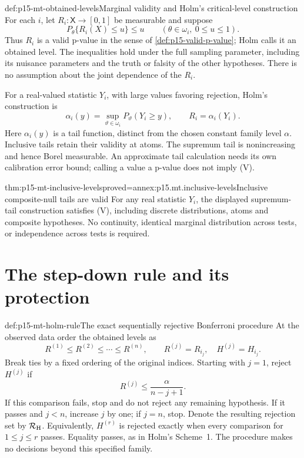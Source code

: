 \begin{hbdefinition}{def:p15-mt-obtained-levels}{Marginal validity and Holm's critical-level construction}
For each \(i\), let \(R_i:\mathsf X\to[0,1]\) be measurable and suppose
\[
 P_\theta\{R_i(X)\leq u\}\leq u
       \qquad(\theta\in\omega_i,\ 0\leq u\leq1).                 \tag{V}
\]
Thus \(R_i\) is a valid p-value in the sense of
\cref{def:p15-valid-p-value}; Holm calls it an obtained level.
The inequalities hold under the full sampling parameter, including its
nuisance parameters and the truth or falsity of the other hypotheses.
There is no assumption about the joint dependence of the \(R_i\).

For a real-valued statistic \(Y_i\), with large values favoring rejection,
Holm's construction is
\[
 \alpha_i(y)=\sup_{\vartheta\in\omega_i}P_\vartheta(Y_i\geq y),
 \qquad R_i=\alpha_i(Y_i).
\]
Here \(\alpha_i(y)\) is a tail function, distinct from the chosen constant
family level \(\alpha\). Inclusive tails retain their validity at atoms.
The supremum tail is nonincreasing and hence Borel measurable.
An approximate tail calculation needs its own calibration error bound;
calling a value a p-value does not imply (V).
\end{hbdefinition}

\begin{hblemma}{thm:p15-mt-inclusive-levels}{proved=annex:p15.mt.inclusive-levels}{Inclusive composite-null tails are valid}
For any real statistic \(Y_i\), the displayed supremum-tail construction
satisfies (V), including discrete distributions, atoms and composite
hypotheses. No continuity, identical marginal distribution across tests,
or independence across tests is required.
\end{hblemma}

\section{The step-down rule and its protection}
\label{sec:p15-mt-step-down}

\begin{hbmethod}{def:p15-mt-holm-rule}{The exact sequentially rejective Bonferroni procedure}
At the observed data order the obtained levels as
\[
 R^{(1)}\leq R^{(2)}\leq\cdots\leq R^{(n)},\qquad
 R^{(j)}=R_{i_j},\quad H^{(j)}=H_{i_j}.
\]
Break ties by a fixed ordering of the original indices.
Starting with \(j=1\), reject \(H^{(j)}\) if
\[
                    R^{(j)}\leq\frac{\alpha}{n-j+1}.
\]
If this comparison fails, stop and do not reject any remaining hypothesis.
If it passes and \(j<n\), increase \(j\) by one; if \(j=n\), stop.
Denote the resulting rejection set by \(\mathcal R_{\rm H}\).
Equivalently, \(H^{(r)}\) is rejected exactly when every comparison for
\(1\leq j\leq r\) passes. Equality passes, as in Holm's Scheme~1.
The procedure makes no decisions beyond this specified family.
\end{hbmethod}

